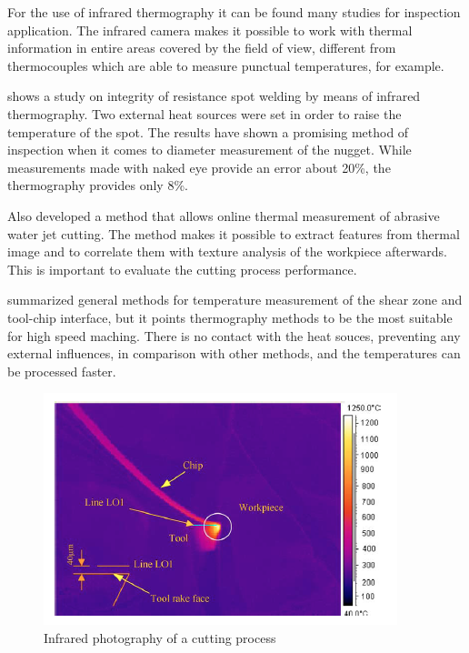 	For the use of infrared thermography it can be found many studies for inspection application. The infrared camera makes it possible to work with thermal information in entire areas covered by the field of view, different from thermocouples which are able to measure punctual temperatures, for example.

	 shows a study on integrity of resistance spot welding by means of infrared thermography. Two external heat sources were set in order to raise the temperature of the spot. The results have shown a promising method of inspection when it comes to diameter measurement of the nugget. While measurements made with naked eye provide an error about 20\%, the thermography provides only 8\%.

	Also  developed a method that allows online thermal measurement of abrasive water jet cutting. The method makes it possible to extract features from thermal image and to correlate them with texture analysis of the workpiece afterwards. This is important to evaluate the cutting process performance.

	 summarized general methods for temperature measurement of the shear zone and tool-chip interface, but it points thermography methods to be the most suitable for high speed maching. There is no contact with the heat souces, preventing any external influences, in comparison with other methods, and the temperatures can be processed faster.	

	\begin{figure}[H]
		\centering
		\captionsetup{justification=centering}
		\includegraphics[scale=0.75]{Cap2/InfraRed/exinfrared.png}
		\caption{Infrared photography of a cutting process \cite{abukhshim2006heat}}
		\label{fig:exinfrared}
	\end{figure}

